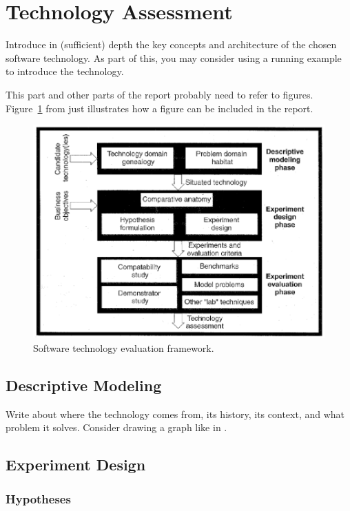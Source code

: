 \section{Technology Assessment}
\label{sec:technology}

Introduce in (sufficient) depth the key concepts and architecture of the chosen software technology. As part of this, you may consider using a running example to introduce the technology.

This part and other parts of the report probably need to refer to
figures. Figure~\ref{fig:framework} from \cite{brown:96} just
illustrates how a figure can be included in the report.

\begin{figure}[thb]
	\centering
	\includegraphics[scale=0.5]{figs/framework.png}
	\caption{Software technology evaluation framework.}
	\label{fig:framework}
\end{figure}

\subsection{Descriptive Modeling}

Write about where the technology comes from, its history, its context, and what problem it solves.
Consider drawing a graph like in \cite{brown:96}.

\subsection{Experiment Design}

\subsubsection*{Hypotheses}

